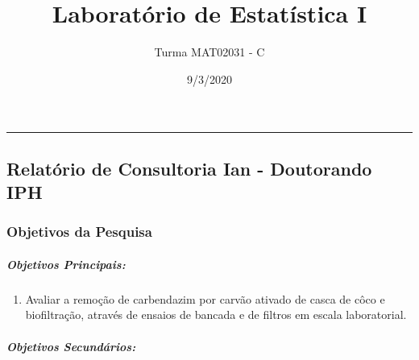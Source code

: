 \documentclass[
]{article}
\title{Laboratório de Estatística I}
\author{Turma MAT02031 - C}
\date{9/3/2020}
\providecommand{\tightlist}{%
  \setlength{\itemsep}{0pt}\setlength{\parskip}{0pt}}
\begin{document}
\maketitle

\begin{center}\rule{0.5\linewidth}{0.5pt}\end{center}

\hypertarget{relatuxf3rio-de-consultoria-ian---doutorando-iph}{%
\subsection{Relatório de Consultoria Ian - Doutorando
IPH}\label{relatuxf3rio-de-consultoria-ian---doutorando-iph}}

\hypertarget{objetivos-da-pesquisa}{%
\subsubsection{Objetivos da Pesquisa}\label{objetivos-da-pesquisa}}

\hypertarget{objetivos-principais}{%
\subparagraph{Objetivos Principais:}\label{objetivos-principais}}

\begin{enumerate}
\def\labelenumi{\alph{enumi})}
\tightlist
\item
  Avaliar a remoção de carbendazim por carvão ativado de casca de côco e
  biofiltração, através de ensaios de bancada e de filtros em escala
  laboratorial.
\end{enumerate}

\hypertarget{objetivos-secunduxe1rios}{%
\subparagraph{Objetivos Secundários:}\label{objetivos-secunduxe1rios}}
\end{document}
